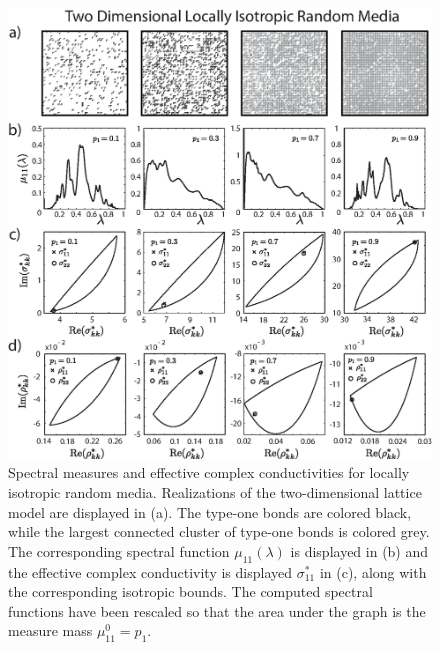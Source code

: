 \documentclass{cmslatex}
\begin{document}
%
\begin{figure}[t]
  \centerline{\includegraphics[scale=0.75]{A_Locally_Isotropic_RRN_11.eps}}
\caption{Spectral measures and effective complex conductivities for
  locally isotropic random media. Realizations of the two-dimensional
  lattice model are displayed in (a). The type-one bonds are colored
  black, while the largest connected cluster of type-one bonds is
  colored grey. The corresponding spectral function $\mu_{11}(\lambda)$ is
  displayed in (b) and the effective complex conductivity is displayed
  $\sigma^*_{11}$ in (c), along with the corresponding isotropic
  bounds. The computed spectral functions have been rescaled so that
  the area under the graph is the measure mass $\mu^0_{11}=p_1$.  
        } 
\label{fig:LocIsotropic_RRN_11}
\end{figure}
%



   
\end{document}
